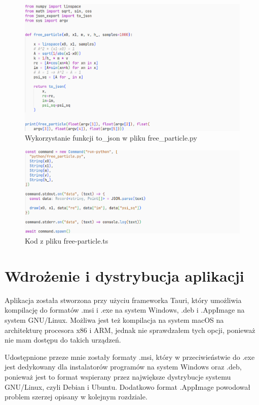 \documentclass{SGGW-thesis}
\begin{document}
	\begin{figure}[H]
	\includegraphics[width=\textwidth,height=\textheight,keepaspectratio]{free_particle py.png} 
	\caption{Wykorzystanie funkcji to\_json w pliku free\_particle.py}
	\label{fig:free-particle-py}
	\end{figure}
	
	\begin{figure}[H]
	\includegraphics[width=\textwidth,height=\textheight,keepaspectratio]{ts run python.png} 
	\caption{Kod z pliku free-particle.ts}	
	\label{fig:ts-run-python}
	\end{figure}
	
	
	\section{Wdrożenie i dystrybucja aplikacji}
	Aplikacja została stworzona przy użyciu frameworka Tauri, który umożliwia kompilację do formatów .msi i .exe na system Windows, .deb i .AppImage na system GNU/Linux. Możliwa jest też kompilacja na system macOS na architekturę procesora x86 i ARM, jednak nie sprawdzałem tych opcji, ponieważ nie mam dostępu do takich urządzeń.
	
	Udostępnione przeze mnie zostały formaty .msi, który w przeciwieństwie do .exe jest dedykowany dla instalatorów programów na system Windows oraz .deb, ponieważ jest to format wspierany przez największe dystrybucje systemu GNU/Linux, czyli Debian i Ubuntu. Dodatkowo format .AppImage powodował problem szerzej opisany w kolejnym rozdziale. 
	
\end{document}
